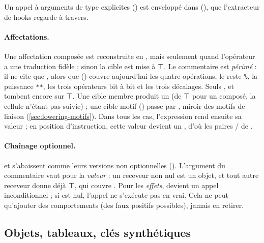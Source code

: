 
Un appel à arguments de type explicites () est enveloppé dans  (), que l'extracteur de hooks regarde à travers.

\paragraph{Affectations.}


Une affectation composée  est reconstruite en , mais seulement quand l'opérateur a une traduction fidèle ; sinon la cible est mise à ⊤. Le commentaire est \emph{périmé} : il ne cite que , alors que  () couvre aujourd'hui les quatre opérations, le reste \texttt{\%}, la puissance \texttt{**}, les trois opérateurs bit à bit et les trois décalages. Seuls \code{&&=}, \code{||=} et  tombent encore sur ⊤. Une cible membre produit un  (de ⊤ pour un composé, la cellule n'étant pas suivie) ; une cible motif () passe par , miroir des motifs de liaison (\cref{sec:lowering-motifs}). Dans tous les cas, l'expression rend ensuite sa valeur ; en position d'instruction, cette valeur devient un , d'où les paires  /  de .

\paragraph{Chaînage optionnel.}  et  s'abaissent comme leurs versions non optionnelles (). L'argument du commentaire vaut pour la \emph{valeur} : un receveur non nul est un objet, et tout autre receveur donne déjà ⊤, qui couvre . Pour les \emph{effets},  devient un appel inconditionnel ; si  est nul, l'appel ne s'exécute pas en vrai. Cela ne peut qu'ajouter des comportements (des faux positifs possibles), jamais en retirer.

\subsection{Objets, tableaux, clés synthétiques}

